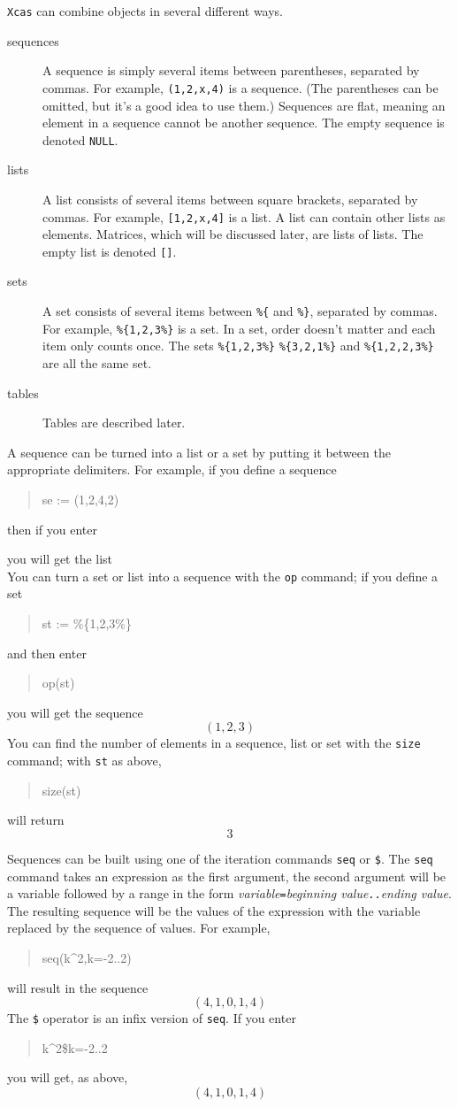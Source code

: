 \documentclass{article}
\newcommand{\xcasin}[1]
{\begin{quote}\ttfamily
#1
\end{quote}}
\newcommand{\xcasout}[1]
{\begin{equation*}
#1
\end{equation*}}
\begin{document}
\texttt{Xcas} can combine objects in several different ways.
\begin{description}
  \item[sequences]
  A sequence is simply several items between parentheses, separated by
  commas.  For example, \texttt{(1,2,x,4)} is a sequence.
  (The parentheses can be omitted, but it's a good idea to use them.)    
  Sequences are flat, meaning an element in a sequence cannot be
  another sequence.
  The empty sequence is denoted \texttt{NULL}.
  \item[lists]
  A list consists of several items between square brackets,
  separated by commas.  For example, \texttt{[1,2,x,4]} is a
  list.  A list can contain other lists as elements.  Matrices, which
  will be discussed later, are lists of lists.  The empty list is
  denoted \texttt{[]}.
  \item[sets]
  A set consists of several items between \texttt{\%\{} and
  \texttt{\%\}}, separated by commas.  For example,
  \texttt{\%\{1,2,3\%\}} is a set.  In a set, order doesn't matter and
  each item only counts once.  The sets \texttt{\%\{1,2,3\%\}}
  \texttt{\%\{3,2,1\%\}} and \texttt{\%\{1,2,2,3\%\}} are all the same
  set.
  \item[tables]
  Tables are described later.
\end{description}
A sequence can be turned into a list or a set by putting it between
the appropriate delimiters.  For example, if you define a sequence
\xcasin{se := (1,2,4,2)}
then if you enter
\xcasin{[se]}
you will get the list
\xcasout{[1,2,4,2]}
You can turn a set or list into a sequence with the \texttt{op}
command; if you define a set
\xcasin{st := \%\{1,2,3\%\}}
and then enter
\xcasin{op(st)}
you will get the sequence
\xcasout{(1,2,3)}
You can find the number of elements in a sequence, list or set with
the \texttt{size} command; with \texttt{st} as above,
\xcasin{size(st)}
will return
\xcasout{3}

Sequences can be built using one of the iteration commands
\texttt{seq} or \texttt{\$}.  The \texttt{seq} command takes an
expression as the first argument, the second argument will be a
variable followed by a range in the form
\textit{variable}\texttt{=}\textit{beginning
value}\texttt{..}\textit{ending value}.  The resulting sequence will be
the values of the expression with the variable replaced by the
sequence of values.  For example,
\xcasin{seq(k\^{}2,k=-2..2)}
will result in the sequence
\xcasout{(4,1,0,1,4)}
The \texttt{\$} operator is an infix version of \texttt{seq}.  If you
enter
\xcasin{k\^{}2\$k=-2..2}
you will get, as above,
\xcasout{(4,1,0,1,4)}
\end{document}

